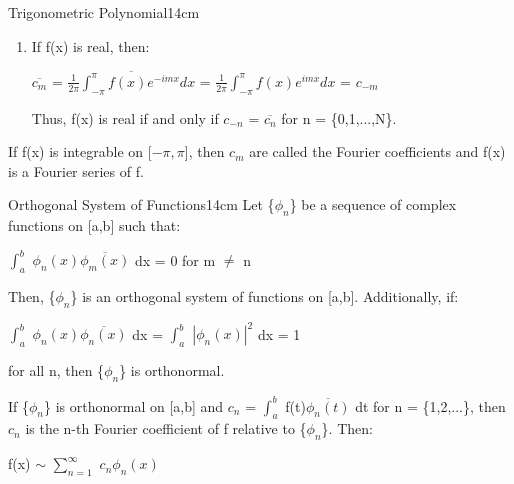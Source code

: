 \begin{definition}{Trigonometric Polynomial}{14cm}
\begin{enumerate}[label=(\alph*), leftmargin=1.5cm, itemsep=0.1cm]
                \hspace{4.2cm}
                = $\sum_{n=-N}^N$ [$\frac{1}{2\pi}$ $\int_{-\pi}^{\pi}$
                    $c_n e^{inx}e^{-imx}$ dx]
                = $c_m$

            \item If f(x) is real, then:
                
                \hspace{0.5cm}
                $\overline{c_m}$
                = $\overline{\frac{1}{2\pi} \int_{-\pi}^{\pi} f(x)e^{-imx} dx}$
                = $\frac{1}{2\pi} \int_{-\pi}^{\pi} f(x)e^{imx} dx$
                = $c_{-m}$

                Thus, f(x) is real if and only if $c_{-n}$ = $\overline{c_n}$
                for n = \{0,1,...,N\}.
        \end{enumerate}

        If f(x) is integrable on [$-\pi,\pi$], then $c_m$ are called the
        Fourier coefficients and f(x) is a Fourier series of f.
    \end{definition}

    \vspace{0.5cm}



    \begin{definition}{Orthogonal System of Functions}{14cm}
        Let \{$\phi_n$\} be a sequence of complex functions on [a,b] such that:

        \hspace{0.5cm}
        $\int_a^b$ $\phi_n(x) \overline{\phi_m(x)}$ dx = 0
        \hspace{1cm}
        for m $\not =$ n

        Then, \{$\phi_n$\} is an orthogonal system of functions on [a,b].
        Additionally, if:
        
        \hspace{0.5cm}
        $\int_a^b$ $\phi_n(x) \overline{\phi_n(x)}$ dx
        = $\int_a^b$ $|\phi_n(x)|^2$ dx = 1
        
        for all n, then \{$\phi_n$\} is orthonormal.

        \vspace{0.2cm}

        If \{$\phi_n$\} is orthonormal on [a,b] and
        $c_n$ = $\int_a^b$ f(t)$\overline{\phi_n(t)}$ dt for n = \{1,2,...\},
        then $c_n$ is the n-th Fourier coefficient of f relative to \{$\phi_n$\}.
        Then:

        \hspace{0.5cm}
        f(x) $\sim$ $\sum_{n=1}^{\infty}$ $c_n\phi_n(x)$
    \end{definition}

